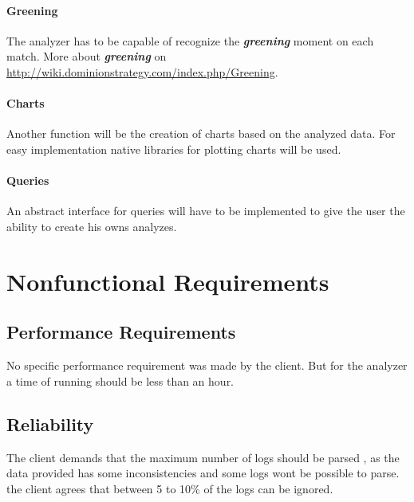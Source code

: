 \documentclass{scrreprt}
\begin{document}
\subsubsection{Greening}
The analyzer has to be capable of recognize the \textit{\textbf{greening}} moment on each match.
More about \textit{\textbf{greening}} on \url{http://wiki.dominionstrategy.com/index.php/Greening}.

\subsubsection{Charts}
Another function will be the creation of charts based on the analyzed data.
For easy implementation native libraries for plotting charts will be used.

\subsubsection{Queries}
An abstract interface for queries will have to be implemented to give the user
the ability to create his owns analyzes.





\chapter{Nonfunctional Requirements}

\section{Performance Requirements}
No specific performance requirement was made by the client. But for the analyzer
a time of running should be less than an hour.



\section{Reliability}
The client demands that the maximum number of logs should be parsed , as the
data provided has some inconsistencies and some logs wont be possible to parse.
the client agrees that between 5 to 10\% of the logs can be ignored.\\
\end{document}
